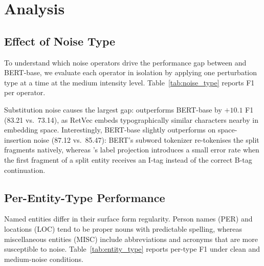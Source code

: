 \section{Analysis}
\label{sec:analysis}

\subsection{Effect of Noise Type}

To understand which noise operators drive the performance gap between
\LightRet{} and BERT-base, we evaluate each operator in isolation by
applying one perturbation type at a time at the medium intensity level.
Table~\ref{tab:noise_type} reports F1 per operator.

\begin{table}[h]
\centering
\caption{F1 by noise operator type (medium intensity).
  All operators apply to the test set; only the specified one is active.}
\label{tab:noise_type}
\end{table}

Substitution noise causes the largest gap: \LightRet{} outperforms BERT-base
by $+10.1$ F1 (83.21 vs.\ 73.14), as RetVec embeds typographically similar
characters nearby in embedding space.
Interestingly, BERT-base slightly outperforms \LightRet{} on space-insertion
noise (87.12 vs.\ 85.47): BERT's subword tokenizer re-tokenises the split
fragments natively, whereas \LightRet{}'s label projection introduces a small
error rate when the first fragment of a split entity receives an I-tag instead
of the correct B-tag continuation.

\subsection{Per-Entity-Type Performance}

Named entities differ in their surface form regularity.
Person names (PER) and locations (LOC) tend to be proper nouns with
predictable spelling, whereas miscellaneous entities (MISC) include
abbreviations and acronyms that are more susceptible to noise.
Table~\ref{tab:entity_type} reports per-type F1 under clean and
medium-noise conditions.

